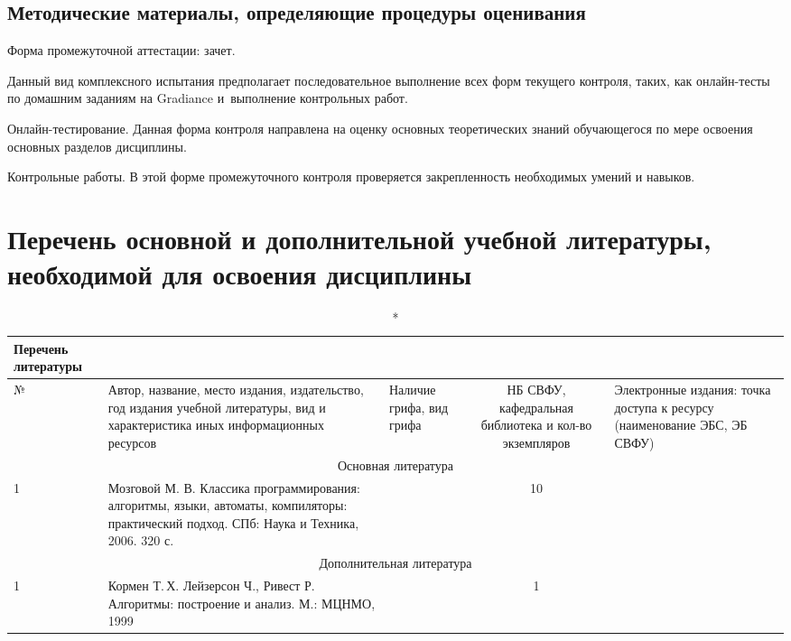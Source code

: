 \documentclass[a4paper,12pt]{article}
\begin{document}
\subsection{Методические материалы, определяющие процедуры оценивания}

Форма промежуточной аттестации: зачет.
\par
Данный вид комплексного испытания предполагает последовательное выполнение
всех форм текущего контроля, таких, как онлайн-тесты по домашним заданиям на Gradiance
и~выполнение контрольных работ.
\par
Онлайн-тестирование. Данная форма контроля направлена на оценку основных
теоретических знаний обучающегося по мере освоения основных разделов дисциплины.
\par
Контрольные работы. В этой форме промежуточного контроля проверяется закрепленность
необходимых умений и навыков.



\newpage
\section{Перечень основной и дополнительной учебной литературы, необходимой для освоения дисциплины}

  \begin{longtable}{|l|p{7cm}|p{18mm}|c|p{32mm}|}
  \caption*{Перечень литературы}\\
  \hline
  № & 
  \centering\small\arraybackslash Автор, название, место издания, издательство, год издания учебной литературы, вид и характеристика иных информационных ресурсов &
  \multicolumn{1}{p{18mm}|}{\centering\small\arraybackslash Наличие грифа, вид грифа} &
  \multicolumn{1}{p{21mm}|}{\centering\small\arraybackslash НБ СВФУ, кафедральная библиотека и кол-во экземпляров} & 
  \centering\small\arraybackslash Электронные издания: точка доступа к ресурсу (наименование ЭБС, ЭБ СВФУ)\\
  \hline
  \multicolumn{5}{|c|}{Основная литература}\\
  \hline
  1 &\raggedright\arraybackslash Мозговой М. В. Классика программирования: алгоритмы, языки, автоматы, компиляторы: практический подход. СПб: Наука и Техника, 2006. 320 с.  &   &  10  &  
  \\
  \hline
  
  \multicolumn{5}{|c|}{Дополнительная литература}\\
  \hline
  1 &\raggedright\arraybackslash Кормен Т.\,Х. Лейзерсон Ч., Ривест Р. Алгоритмы: построение и анализ. М.: МЦНМО, 1999  &   &  1  &  
  \\
  \hline
  
  \end{longtable}
  
\end{document}
